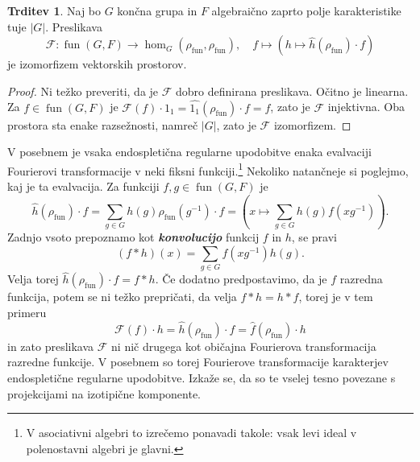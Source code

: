 \documentclass[11pt]{book}
\def\Fcal{\mathcal{F}}
\DeclareMathOperator\fun{fun}
\def\definicija{\color{rdeca}\bf\em}
\theoremstyle{definition}
\theoremstyle{zgled}
\theoremstyle{odprtproblem}
\theoremstyle{domacanaloga}
\newenvironment{dokaz}
    {\color{siva}\begin{proof}}
    {\end{proof}}
\theoremstyle{izrek}
\newtheorem*{trditev}{Trditev}
\begin{document}
\begin{trditev}
Naj bo $G$ končna grupa in $F$ algebraično zaprto polje karakteristike tuje $|G|$. Preslikava
\[
    \Fcal \colon \fun(G,F) \to \hom_G(\rho_{\fun}, \rho_{\fun}), \quad
    f \mapsto \left( h \mapsto \hat{h}(\rho_{\fun}) \cdot f \right)
\]
je izomorfizem vektorskih prostorov.
\end{trditev}
\begin{dokaz}
Ni težko preveriti, da je $\Fcal$ dobro definirana preslikava. Očitno je linearna. Za $f \in \fun(G,F)$ je $\Fcal(f) \cdot 1_1 = \widehat{1_1}(\rho_{\fun}) \cdot f = f$, zato je $\Fcal$ injektivna. Oba prostora sta enake razsežnosti, namreč $|G|$, zato je $\Fcal$ izomorfizem.
\end{dokaz}

V posebnem je vsaka endospletična regularne upodobitve enaka evalvaciji Fourierovi transformacije v neki fiksni funkciji.\footnote{V asociativni algebri to izrečemo ponavadi takole: vsak levi ideal v polenostavni algebri je glavni.} Nekoliko natančneje si poglejmo, kaj je ta evalvacija. Za funkciji $f,g \in \fun(G,F)$ je
\[
    \hat{h}(\rho_{\fun}) \cdot f = \sum_{g \in G} h(g) \rho_{\fun}(g^{-1}) \cdot f =
    \left( x \mapsto \sum_{g \in G} h(g) f(x g^{-1}) \right).
\]
Zadnjo vsoto prepoznamo kot {\definicija konvolucijo} funkcij $f$ in $h$, se pravi
\[
    \left( f * h \right) (x) = \sum_{g \in G} f(x g^{-1}) h(g).
\]
Velja torej $\hat{h}(\rho_{\fun}) \cdot f = f * h$. Če dodatno predpostavimo, da je $f$ razredna funkcija, potem se ni težko prepričati, da velja $f * h = h * f$, torej je v tem primeru
\[
    \Fcal(f) \cdot h = \hat{h}(\rho_{\fun}) \cdot f = \hat{f}(\rho_{\fun}) \cdot h 
\]
in zato preslikava $\Fcal$ ni nič drugega kot običajna Fourierova transformacija razredne funkcije. V posebnem so torej Fourierove transformacije karakterjev endospletične regularne upodobitve. Izkaže se, da so te vselej tesno povezane s projekcijami na izotipične komponente.
\end{document}
